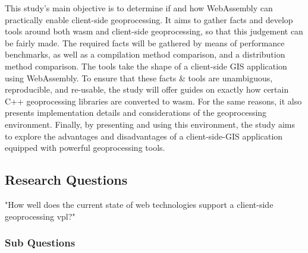 This study's main objective is to determine if and how WebAssembly can practically enable client-side geoprocessing. It aims to gather facts and develop tools around both wasm and client-side geoprocessing, so that this judgement can be fairly made. 
The required facts will be gathered by means of performance benchmarks, as well as a compilation method comparison, and a distribution method comparison.  
The tools take the shape of a client-side GIS application using WebAssembly.
To ensure that these facts \& tools are unambiguous, reproducible, and re-usable, the study will offer guides on exactly how certain C++ geoprocessing libraries are converted to wasm. For the same reasons, it also presents implementation details and considerations of the geoprocessing environment.  
Finally, by presenting and using this environment, the study aims to explore the advantages and disadvantages of a client-side-GIS application equipped with powerful geoprocessing tools. 




\subsection{Research Questions}

"How well does the current state of web technologies support a client-side geoprocessing vpl?"

\subsubsection*{Sub Questions}

